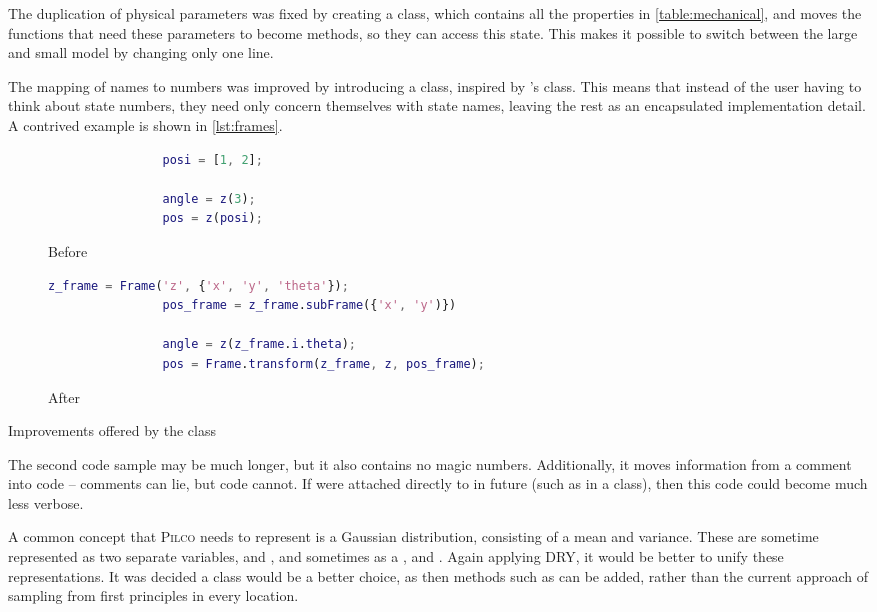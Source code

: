 \documentclass[main.tex]{subfiles}
\begin{document}
	The duplication of physical parameters was fixed by creating a  class, which contains all the properties in \cref{table:mechanical}, and moves the functions that need these parameters to become methods, so they can access this state.
	This makes it possible to switch between the large and small model by changing only one line.

	The mapping of names to numbers was improved by introducing a  class, inspired by 's \cite{drake}  class.
	This means that instead of the user having to think about state numbers, they need only concern themselves with state names, leaving the rest as an encapsulated implementation detail.
	A contrived example is shown in \cref{lst:frames}.

	\begin{listingfloat}
		\centering
		\begin{subfigure}{0.4\linewidth-1em}
			\begin{lstlisting}[language=matlab,frame=single,gobble=8]
				% coords are x, y, theta
				posi = [1, 2];

				angle = z(3);
				pos = z(posi);
			\end{lstlisting}
			\caption{Before}
		\end{subfigure}
		\hfill
		\begin{subfigure}{0.6\linewidth-1em}
			\begin{lstlisting}[language=matlab,frame=single,gobble=8]
				z_frame = Frame('z', {'x', 'y', 'theta'});
				pos_frame = z_frame.subFrame({'x', 'y')})

				angle = z(z_frame.i.theta);
				pos = Frame.transform(z_frame, z, pos_frame);
			\end{lstlisting}
			\caption{After}
		\end{subfigure}
		\caption{Improvements offered by the  class}
		\label{lst:frames}
		\medskip
		\small
		The second code sample may be much longer, but it also contains no magic numbers.
		Additionally, it moves information from a comment into code -- comments can lie, but code cannot.
		If  were attached directly to  in future (such as in a  class), then this code could become much less verbose.
	\end{listingfloat}

	A common concept that \textsc{Pilco} needs to represent is a Gaussian distribution, consisting of a mean and variance.
	These are sometime represented as two separate variables,  and , and sometimes as a ,  and .
	Again applying DRY, it would be better to unify these representations.
	It was decided a class would be a better choice, as then methods such as  can be added, rather than the current approach of sampling from first principles in every location.
\end{document}
